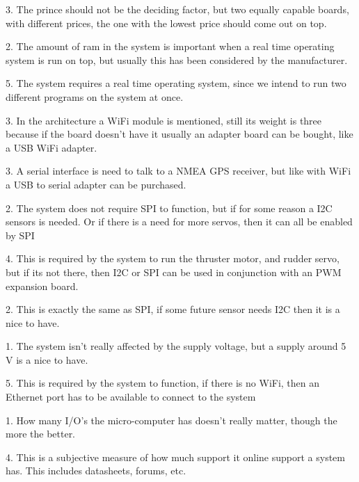 \begin{description}[itemsep=0mm]
\item[Price] 3. The prince should not be the deciding factor, but two equally capable boards, with different prices, the one with the lowest price should come out on top.
\item[Ram] 2. The amount of ram in the system is important when a real time operating system is run on top, but usually this has been considered by the manufacturer.  
\item[Real time operating system] 5. The system requires a real time operating system, since we intend to run two different programs on the system at once.
\item[WiFi module] 3. In the architecture a WiFi module is mentioned, still its weight is three because if the board doesn't have it usually an adapter board can be bought, like a USB WiFi adapter.
\item[UART serial] 3. A serial interface is need to talk to a NMEA GPS receiver, but like with WiFi a USB to serial adapter can be purchased.
\item[SPI] 2. The system does not require SPI to function, but if for some reason a I2C sensors is needed. Or if there is a need for more servos, then it can all be enabled by SPI
\item[PWM] 4. This is required by the system to run the thruster motor, and rudder servo, but if its not there, then I2C or SPI can be used in conjunction with an PWM expansion board.
\item[I2C] 2. This is exactly the same as SPI, if some future sensor needs I2C then it is a nice to have.
\item[Supply voltage] 1. The system isn't really affected by the supply voltage, but a supply around 5 V is a nice to have.
\item[Ethernet Port] 5. This is required by the system to function, if there is no WiFi, then an Ethernet port has to be available to connect to the system 
\item[General purpose I/O] 1. How many I/O's the micro-computer has doesn't really matter, though the more the better.
\item[Support level] 4. This is a subjective measure of how much support it online support a system has. This includes datasheets, forums, etc.
\end{description}

